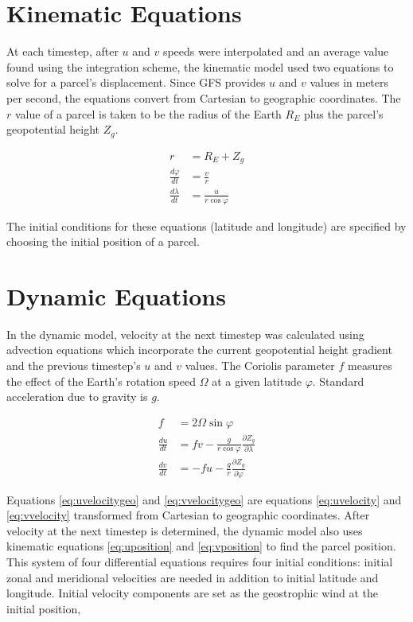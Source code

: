 \section{Kinematic Equations}
At each timestep, after $u$ and $v$ speeds were interpolated and an average value found using the integration scheme, the kinematic model used two equations to solve for a parcel's displacement. 
Since GFS provides $u$ and $v$ values in meters per second, the equations convert from Cartesian to geographic coordinates. 
The $r$ value of a parcel is taken to be the radius of the Earth $R_E$ plus the parcel's geopotential height $Z_g$.

\begin{align}
r &= R_E + Z_g \\[2ex]
\frac{d \varphi}{dt} &= \frac{v}{r} \label{eq:uposition} \\
\frac{d \lambda}{dt} &= \frac{u}{r \cos{\varphi}} \label{eq:vposition}
\end{align}

The initial conditions for these equations (latitude and longitude) are specified by choosing the initial position of a parcel.

\section{Dynamic Equations}
In the dynamic model, velocity at the next timestep was calculated using advection equations which incorporate the current geopotential height gradient and the previous timestep's $u$ and $v$ values.
The Coriolis parameter $f$ measures the effect of the Earth's rotation speed $\Omega$ at a given latitude $\varphi$.
Standard acceleration due to gravity is $g$. 

\begin{align}
f &= 2 \Omega \sin{\varphi} \\[2ex]
\frac{du}{dt} &= fv - \frac{g}{r \cos{\varphi}} \frac{\partial Z_g}{\partial \lambda} \label{eq:uvelocitygeo}\\
\frac{dv}{dt} &= -fu -\frac{g}{r} \frac{\partial Z_g}{\partial \varphi} \label{eq:vvelocitygeo}
\end{align}

Equations \ref{eq:uvelocitygeo} and \ref{eq:vvelocitygeo} are equations \ref{eq:uvelocity} and \ref{eq:vvelocity} transformed from Cartesian to geographic coordinates. 
After velocity at the next timestep is determined, the dynamic model also uses kinematic equations \ref{eq:uposition} and \ref{eq:vposition} to find the parcel position.
This system of four differential equations requires four initial conditions: initial zonal and meridional velocities are needed in addition to initial latitude and longitude.
Initial velocity components are set as the geostrophic wind at the initial position,

